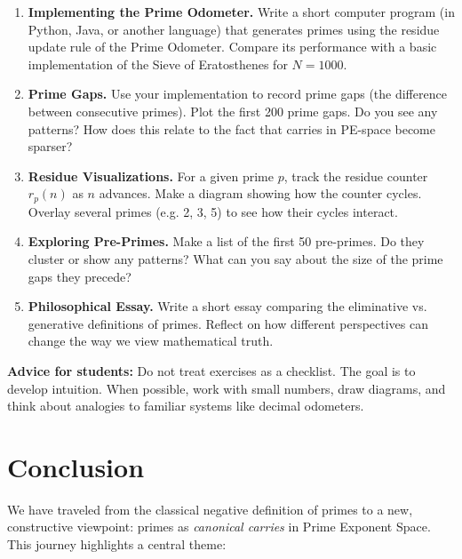 \documentclass[11pt]{article}
\theoremstyle{definition}
\begin{document}
\begin{enumerate}[label=\textbf{Project \#\arabic*:}, leftmargin=*]

  \item \textbf{Implementing the Prime Odometer.}  
  Write a short computer program (in Python, Java, or another language) 
  that generates primes using the residue update rule of the Prime Odometer.  
  Compare its performance with a basic implementation of the Sieve of Eratosthenes 
  for $N=1000$.  

  \item \textbf{Prime Gaps.}  
  Use your implementation to record prime gaps (the difference between consecutive primes).  
  Plot the first 200 prime gaps. Do you see any patterns?  
  How does this relate to the fact that carries in PE-space become sparser?  

  \item \textbf{Residue Visualizations.}  
  For a given prime $p$, track the residue counter $r_p(n)$ as $n$ advances.  
  Make a diagram showing how the counter cycles.  
  Overlay several primes (e.g. 2, 3, 5) to see how their cycles interact.  

  \item \textbf{Exploring Pre-Primes.}  
  Make a list of the first 50 pre-primes.  
  Do they cluster or show any patterns?  
  What can you say about the size of the prime gaps they precede?  

  \item \textbf{Philosophical Essay.}  
  Write a short essay comparing the eliminative vs. generative definitions of primes.  
  Reflect on how different perspectives can change the way we view mathematical truth.  

\end{enumerate}

\begin{studentnote}
\textbf{Advice for students:}  
Do not treat exercises as a checklist.  
The goal is to develop intuition.  
When possible, work with small numbers, draw diagrams, 
and think about analogies to familiar systems like decimal odometers. 
\end{studentnote}

\section{Conclusion}

We have traveled from the classical negative definition of primes to a new, 
constructive viewpoint: primes as \emph{canonical carries} in Prime Exponent Space.  
This journey highlights a central theme:
\end{document}
